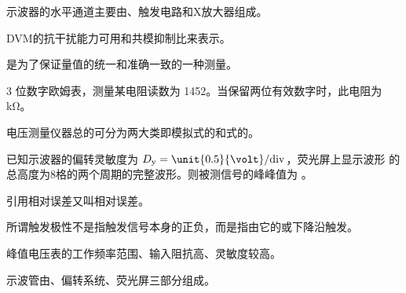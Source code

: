 \documentclass[a4paper,12pt]{examdesign}
\begin{document}
\newcommand\mathdot[1]{\dot#1}

\begin{fillin}[title={一、填空题 (每题 2 分，共 20 分)}]
    \begin{question}
        示波器的水平通道主要由、触发电路和X放大器组成。
    \end{question}
    \begin{question}
        DVM的抗干扰能力可用和共模抑制比来表示。
    \end{question}
    \begin{question}
        是为了保证量值的统一和准确一致的一种测量。
    \end{question}
    \begin{question}
        3 位数字欧姆表，测量某电阻读数为 \unit{1452}{\ohm}。当保留两位有效数字时，此电阻为kΩ。
    \end{question}
    \begin{question}
        电压测量仪器总的可分为两大类即模拟式的和式的。
    \end{question}
    \begin{question}
        已知示波器的偏转灵敏度为
        $D_\mathrm{y}=\unit{0.5}{\volt}/\mathrm{div}$，荧光屏上显示波形
        的总高度为8格的两个周期的完整波形。则被测信号的峰峰值为
        。
    \end{question}
    \begin{question}
        引用相对误差又叫相对误差。
    \end{question}
    \begin{question}
        所谓触发极性不是指触发信号本身的正负，而是指由它的或下降沿触发。
    \end{question}
    \begin{question}
        峰值电压表的工作频率范围、输入阻抗高、灵敏度较高。
    \end{question}
    \begin{question}
        示波管由、偏转系统、荧光屏三部分组成。
    \end{question}
\end{fillin}
\end{document}

